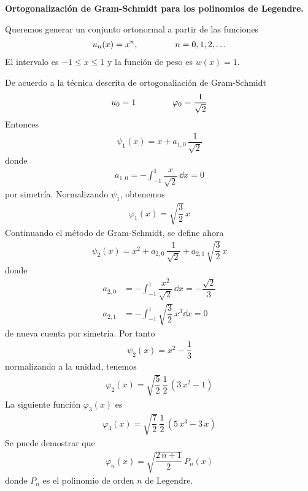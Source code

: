 \begin{ejemplo} \textbf{Ortogonalización de Gram-Schmidt para los polinomios de Legendre.}

Queremos generar un conjunto ortonormal a partir de las funciones 
\begin{align*}
u_{n}(x) = x^{n}, \hspace{1.5cm} n = 0, 1, 2, \ldots
\end{align*}
El intervalo es $-1 \leq x \leq 1$ y la función de peso es $w(x)=1$.
\par
De acuerdo a la técnica descrita de ortogonaliación de Gram-Schmidt
\begin{align}
u_{0} = 1 \hspace{1.5cm} \varphi_{0} =  \dfrac{1}{\sqrt{2}}
\label{eq:ecuacion_10_50}
\end{align}
Entonces
\begin{align}
\psi_{1}(x) = x + a_{1,0} \, \dfrac{1}{\sqrt{2}}
\label{eq:ecuacion_10_51}
\end{align}
donde
\begin{align}
a_{1, 0} = - \int_{-1}^{1} \dfrac{x}{\sqrt{2}} \, \dd{x} = 0
\label{eq:ecuacion_10_52}
\end{align}
por simetría. Normalizando $\psi_{1}$, obtenemos
\begin{align}
\varphi_{1}(x) = \sqrt{\dfrac{3}{2}} \, x
\label{eq:ecuacion_10_53}
\end{align}
Continuando el método de Gram-Schmidt, se define ahora
\begin{align}
\psi_{2} (x) = x^{2} +  a_{2, 0} \, \dfrac{1}{\sqrt{2}} +  a_{2, 1} \, \sqrt{\dfrac{3}{2}} \, x
\label{eq:ecuacion_10_54}
\end{align}
donde
\begin{align}
a_{2, 0} &= - \int_{-1}^{1} \dfrac{x^{2}}{\sqrt{2}} \, \dd{x} = - \dfrac{\sqrt{2}}{3} \label{eq:ecuacion_10_55} \\[1em] 
a_{2, 1} &= - \int_{-1}^{1} \sqrt{\dfrac{3}{2}} \, x^{3} \dd{x} = 0 \label{eq:ecuacion_10_56}
\end{align}
de nueva cuenta por simetría. Por tanto
\begin{align}
\psi_{2}(x) = x^{2} - \dfrac{1}{3}
\label{eq:ecuacion_10_57}
\end{align}
normalizando a la unidad, tenemos
\begin{align}
\varphi_{2} (x) = \sqrt{\dfrac{5}{2}} \, \dfrac{1}{2} \, (3 \, x^{2} - 1)
\label{eq:ecuacion_10_58}
\end{align}
La siguiente función $\varphi_{3}(x)$ es
\begin{align}
\varphi_{3} (x) = \sqrt{\dfrac{7}{2}} \, \dfrac{1}{2} \, (5 \, x^{3} - 3 \, x)
\label{eq:ecuacion_10_59}
\end{align}
Se puede demostrar que
\begin{align}
\varphi_{n}(x) = \sqrt{\dfrac{2 \, n + 1}{2}} \, P_{n}(x)
\label{eq:ecuacion_10_60}
\end{align}
donde $P_{n}$ es el polinomio de orden $n$ de Legendre.
\end{ejemplo}
